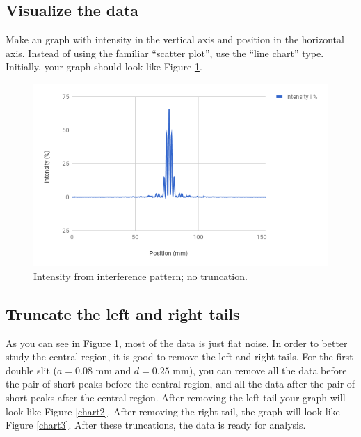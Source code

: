 \subsection{Visualize the data}
Make an graph with intensity in the vertical axis and position in the horizontal axis. Instead of using the familiar ``scatter plot'', use the ``line chart'' type. Initially, your graph should look like Figure \ref{chart1}.
\begin{figure}[ht!]
	\centering
	\includegraphics[scale=0.77]{images/10-interference/chart1.png}
	\caption{Intensity from interference pattern; no truncation.}
	\label{chart1}
\end{figure}
\subsection{Truncate the left and right tails}
As you can see in Figure \ref{chart1}, most of the data is just flat noise. In order to better study the central region, it is good to remove the left and right tails. For the first double slit ($a = 0.08$ mm and $d = 0.25$ mm), you can remove all the data before the pair of short peaks before the central region, and all the data after the pair of short peaks after the central region. After removing the left tail your graph will look like Figure \ref{chart2}. After removing the right tail, the graph will look like Figure \ref{chart3}. After these truncations, the data is ready for analysis.

